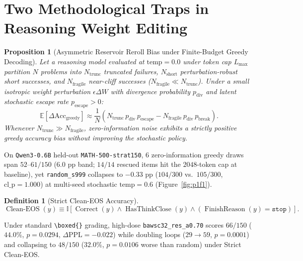 \documentclass[11pt,letterpaper]{article}
\newtheorem{proposition}{Proposition}
\newtheorem{definition}{Definition}
\begin{document}
\section{Two Methodological Traps in Reasoning Weight Editing}
\begin{proposition}[Asymmetric Reservoir Reroll Bias under Finite-Budget Greedy Decoding]
Let a reasoning model evaluated at $\text{temp}=0.0$ under token cap $L_{\max}$ partition $N$ problems into $N_{\text{trunc}}$ truncated failures, $N_{\text{short}}$ perturbation-robust short successes, and $N_{\text{fragile}}$ near-cliff successes ($N_{\text{fragile}} \ll N_{\text{trunc}}$). Under a small isotropic weight perturbation $\epsilon \Delta W$ with divergence probability $p_{\text{div}}$ and latent stochastic escape rate $p_{\text{escape}}>0$:
\begin{equation}
\mathbb{E}[\Delta \text{Acc}_{\text{greedy}}] \approx \frac{1}{N}\left(N_{\text{trunc}}\,p_{\text{div}}\,p_{\text{escape}} - N_{\text{fragile}}\,p_{\text{div}}\,p_{\text{break}}\right).
\end{equation}
Whenever $N_{\text{trunc}} \gg N_{\text{fragile}}$, zero-information noise exhibits a strictly positive greedy accuracy bias without improving the stochastic policy.
\end{proposition}

On \texttt{Qwen3-0.6B} held-out \texttt{MATH-500-strat150}, 6 zero-information greedy draws span $52\text{--}61/150$ ($6.0\text{ pp}$ band; $14/14$ rescued items hit the $2048$-token cap at baseline), yet \texttt{random\_s999} collapses to $-0.33\text{ pp}$ ($104/300$ vs.\ $105/300$, $\text{cl\_p}=1.000$) at multi-seed stochastic $\text{temp}=0.6$ (Figure~\ref{fig:p1f1}).

\begin{definition}[Strict Clean-EOS Accuracy]
\begin{equation}
\operatorname{Clean-EOS}(y) \equiv \mathbb{I}\!\left[\operatorname{Correct}(y) \wedge \operatorname{HasThinkClose}(y) \wedge (\operatorname{FinishReason}(y) = \texttt{stop})\right].
\end{equation}
\end{definition}

Under standard \texttt{\textbackslash boxed\{\}} grading, high-dose \texttt{bawsc32\_res\_a0.70} scores $66/150$ ($44.0\%$, $p=0.0294$, $\Delta\text{PPL}=-0.022$) while doubling loops ($29 \to 59$, $p=0.0001$) and collapsing to $48/150$ ($32.0\%$, $p=0.0106$ worse than random) under Strict Clean-EOS.
\end{document}
